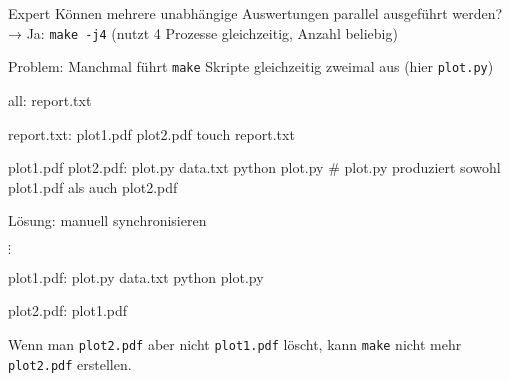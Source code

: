 \begin{frame}[fragile]{Expert}
  Können mehrere unabhängige Auswertungen parallel ausgeführt werden? \\
  → Ja: \;\texttt{make -j4}\; (nutzt 4 Prozesse gleichzeitig, Anzahl beliebig)

  Problem: Manchmal führt \texttt{make} Skripte gleichzeitig zweimal aus (hier \texttt{plot.py})
  \begin{center}
    \begin{lstmake}
      all: report.txt

      report.txt: plot1.pdf plot2.pdf
        touch report.txt

      plot1.pdf plot2.pdf: plot.py data.txt
        python plot.py  # plot.py produziert sowohl plot1.pdf als auch plot2.pdf
    \end{lstmake}
  \end{center}

  Lösung: manuell synchronisieren
  \begin{center}
    $\vdots$ \\
    \begin{lstmake}
      plot1.pdf: plot.py data.txt
          python plot.py

      plot2.pdf: plot1.pdf
    \end{lstmake}
  \end{center}

  Wenn man \texttt{plot2.pdf} aber nicht \texttt{plot1.pdf} löscht, kann \texttt{make} nicht mehr \texttt{plot2.pdf} erstellen.
\end{frame}
